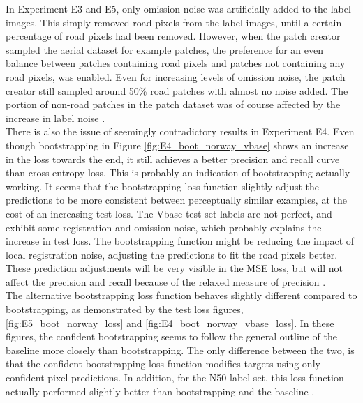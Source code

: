 In Experiment E3 and E5, only omission noise was artificially added to the label images. This simply removed road pixels from the label images, until a certain percentage of road pixels had been removed. However, when the patch creator sampled the aerial dataset for example patches, the preference for an even balance between patches containing road pixels and patches not containing any road pixels, was enabled. Even for increasing levels of omission noise, the patch creator still sampled around 50\% road patches with almost no noise added. The portion of non-road patches in the patch dataset was of course affected by the increase in label noise .\\

There is also the issue of seemingly contradictory results in Experiment E4. Even though bootstrapping in Figure \ref{fig:E4_boot_norway_vbase} shows an increase in the loss towards the end, it still achieves a better precision and recall curve than cross-entropy loss. This is probably an indication of bootstrapping actually working. It seems that the bootstrapping loss function slightly adjust the predictions to be more consistent between perceptually similar examples, at the cost of an increasing test loss. The Vbase test set labels are not perfect, and exhibit some registration and omission noise, which probably explains the increase in test loss. The bootstrapping function might be reducing the impact of local registration noise,  adjusting the predictions to fit the road pixels better. These prediction adjustments will be very visible in the MSE loss, but will not affect the precision and recall because of the relaxed measure of precision . \\

The alternative bootstrapping loss function  behaves slightly different compared to bootstrapping, as demonstrated by the test loss figures, \ref{fig:E5_boot_norway_loss} and \ref{fig:E4_boot_norway_vbase_loss}. In these figures, the confident bootstrapping seems to follow the general outline of the baseline more closely than bootstrapping. The only difference between the two, is that the confident bootstrapping loss function modifies targets using only confident pixel predictions. In addition, for the N50 label set, this loss function actually performed slightly better than bootstrapping and the baseline .\\ 


